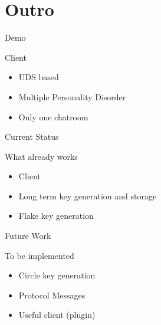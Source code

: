 \section{Outro}

\begin{frame}{Demo}
	\begin{block}{Client}
		\begin{itemize}
			\item UDS based
			\item Multiple Personality Disorder
			\item Only one chatroom
		\end{itemize}
	\end{block}
\end{frame}

\begin{frame}{Current Status}
	\begin{block}{What already works}
		\begin{itemize}
			\item Client
			\item Long term key generation and storage
			\item Flake key generation
		\end{itemize}
	\end{block}
\end{frame}

\begin{frame}{Future Work}
	\begin{block}{To be implemented}
		\begin{itemize}
			\item Circle key generation
			\item Protocol Messages
			\item Useful client (plugin)
		\end{itemize}
	\end{block}
\end{frame}
